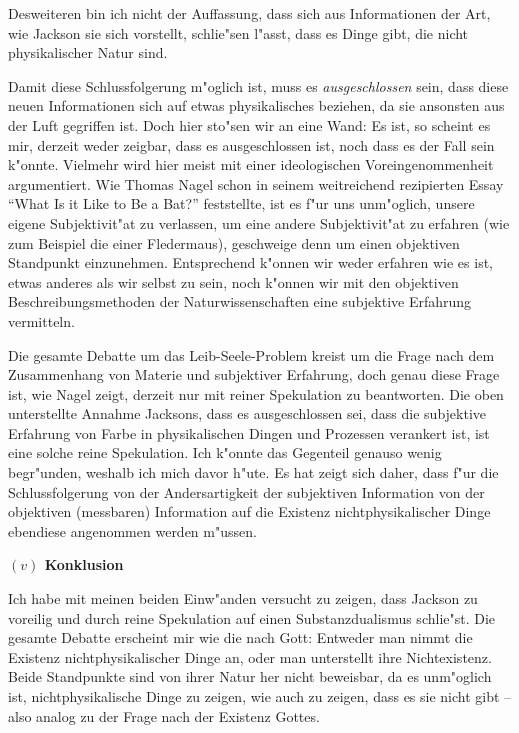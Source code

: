 \documentclass[a4paper, emulatestandardclasses, 12pt]{scrartcl}
\begin{document}
\begin{onehalfspace}
\noindent Desweiteren bin ich nicht der Auffassung, dass sich aus Informationen der Art, wie Jackson sie sich vorstellt, schlie"sen l"asst, dass es Dinge gibt, die nicht physikalischer Natur sind. %

Damit diese Schlussfolgerung m"oglich ist, muss es \emph{ausgeschlossen} sein, dass diese neuen Informationen sich auf etwas physikalisches beziehen, da sie ansonsten aus der Luft gegriffen ist. Doch hier sto"sen wir an eine Wand: Es ist, so scheint es mir, derzeit weder zeigbar, dass es ausgeschlossen ist, noch dass es der Fall sein k"onnte. Vielmehr wird hier meist mit einer ideologischen Voreingenommenheit argumentiert. Wie Thomas Nagel schon in seinem weitreichend rezipierten Essay "`What Is it Like to Be a Bat?"' \citep{nagel1974like} feststellte, ist es f"ur uns unm"oglich, unsere eigene Subjektivit"at zu verlassen, um eine andere Subjektivit"at zu erfahren (wie zum Beispiel die einer Fledermaus), geschweige denn um einen objektiven Standpunkt einzunehmen. Entsprechend k"onnen wir weder erfahren wie es ist, etwas anderes als wir selbst zu sein, noch k"onnen wir mit den objektiven Beschreibungsmethoden der Naturwissenschaften eine subjektive Erfahrung vermitteln. 

Die gesamte Debatte um das Leib-Seele-Problem kreist um die Frage nach dem Zusammenhang von Materie und subjektiver Erfahrung, doch genau diese Frage ist, wie Nagel zeigt, derzeit nur mit reiner Spekulation zu beantworten. Die oben unterstellte Annahme Jacksons, dass es ausgeschlossen sei, dass die subjektive Erfahrung von Farbe in physikalischen Dingen und Prozessen verankert ist, ist eine solche reine Spekulation. Ich k"onnte das Gegenteil genauso wenig begr"unden, weshalb ich mich davor h"ute. Es hat zeigt sich daher, dass f"ur die Schlussfolgerung von der Andersartigkeit der subjektiven Information von der objektiven (messbaren) Information auf die Existenz nichtphysikalischer Dinge ebendiese angenommen werden m"ussen. 


\vspace{5mm}
\noindent\textbf{$(v)$ Konklusion}

\noindent Ich habe mit meinen beiden Einw"anden versucht zu zeigen, dass Jackson zu voreilig und durch reine Spekulation auf einen Substanzdualismus schlie"st. Die gesamte Debatte erscheint mir wie die nach Gott: Entweder man nimmt die Existenz nichtphysikalischer Dinge an, oder man unterstellt ihre Nichtexistenz. Beide Standpunkte sind von ihrer Natur her nicht beweisbar, da es unm"oglich ist, nichtphysikalische Dinge zu zeigen, wie auch zu zeigen, dass es sie nicht gibt -- also analog zu der Frage nach der Existenz Gottes. 


\end{onehalfspace}
\end{document}
